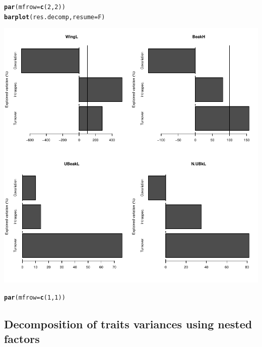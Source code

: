 \documentclass[12pt]{article}\usepackage[]{graphicx}\usepackage[]{color}
\makeatletter
\def\maxwidth{ %
  \ifdim\Gin@nat@width>\linewidth
    \linewidth
  \else
    \Gin@nat@width
  \fi
}
\newcommand{\hlnum}[1]{\textcolor[rgb]{0.686,0.059,0.569}{#1}}%
\newcommand{\hlstd}[1]{\textcolor[rgb]{0.345,0.345,0.345}{#1}}%
\newcommand{\hlkwc}[1]{\textcolor[rgb]{0.333,0.667,0.333}{#1}}%
\newcommand{\hlkwd}[1]{\textcolor[rgb]{0.737,0.353,0.396}{\textbf{#1}}}%
\newenvironment{kframe}{%
 \def\at@end@of@kframe{}%
 \ifinner\ifhmode%
  \def\at@end@of@kframe{\end{minipage}}%
  \begin{minipage}{\columnwidth}%
 \fi\fi%
 \def\FrameCommand##1{\hskip\@totalleftmargin \hskip-\fboxsep
 \colorbox{shadecolor}{##1}\hskip-\fboxsep
     \hskip-\linewidth \hskip-\@totalleftmargin \hskip\columnwidth}%
 \MakeFramed {\advance\hsize-\width
   \@totalleftmargin\z@ \linewidth\hsize
   \@setminipage}}%
 {\par\unskip\endMakeFramed%
 \at@end@of@kframe}
\newenvironment{knitrout}{}{} %
\makeatother
\begin{document}
\begin{knitrout}
\color{fgcolor}\begin{kframe}
\begin{alltt}
\hlkwd{par}\hlstd{(}\hlkwc{mfrow} \hlstd{=} \hlkwd{c}\hlstd{(}\hlnum{2}\hlstd{,}\hlnum{2}\hlstd{))}
\hlkwd{barplot}\hlstd{(res.decomp,} \hlkwc{resume} \hlstd{= F)}
\end{alltt}
\end{kframe}

{\centering \includegraphics[width=\maxwidth]{figure/unnamed-chunk-23} 

}


\begin{kframe}\begin{alltt}
\hlkwd{par}\hlstd{(}\hlkwc{mfrow} \hlstd{=} \hlkwd{c}\hlstd{(}\hlnum{1}\hlstd{,}\hlnum{1}\hlstd{))}
\end{alltt}
\end{kframe}
\end{knitrout}

\newpage

\subsection{Decomposition of traits variances using nested factors}
\end{document}
